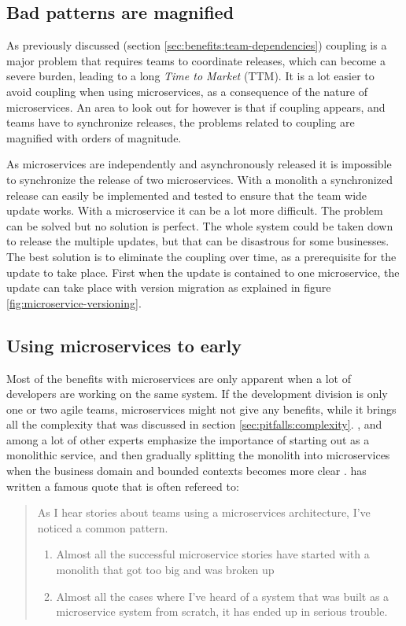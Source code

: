 \documentclass[a4paper]{article}
\begin{document}
\subsection{Bad patterns are magnified}

As previously discussed (section \ref{sec:benefits:team-dependencies}) coupling is a major problem that requires teams to coordinate releases, which can become a severe burden, leading to a long \textit{Time to Market} (TTM). It is a lot easier to avoid coupling when using microservices, as a consequence of the nature of microservices. An area to look out for however is that if coupling appears, and teams have to synchronize releases, the problems related to coupling are magnified with orders of magnitude.

As microservices are independently and asynchronously released it is impossible to synchronize the release of two microservices. With a monolith a synchronized release can easily be implemented and tested to ensure that the team wide update works. With a microservice it can be a lot more difficult. The problem can be solved but no solution is perfect. The whole system could be taken down to release the multiple updates, but that can be disastrous for some businesses. The best solution is to eliminate the coupling over time, as a prerequisite for the update to take place. First when the update is contained to one microservice, the update can take place with version migration as explained in figure \ref{fig:microservice-versioning}.

\subsection{Using microservices to early}
Most of the benefits with microservices are only apparent when a lot of developers are working on the same system. If the development division is only one or two agile teams, microservices might not give any benefits, while it brings all the complexity that was discussed in section \ref{sec:pitfalls:complexity}. \citeauthor{Fowler2015}, \citeauthor{Newman2015} and \citeauthor{Buijze2018} among a lot of other experts emphasize the importance of starting out as a monolithic service, and then gradually splitting the monolith into microservices when the business domain and bounded contexts becomes more clear \cite{Fowler2015,Newman2015,Buijze2018}. \citeauthor{Fowler2015} has written a famous quote that is often refereed to:
\begin{quote}
As I hear stories about teams using a microservices architecture, I've noticed a common pattern.
\begin{enumerate}
    \item Almost all the successful microservice stories have started with a monolith that got too big and was broken up
    \item Almost all the cases where I've heard of a system that was built as a microservice system from scratch, it has ended up in serious trouble.\cite{Fowler2015}
\end{enumerate}

\end{quote}
\end{document}
